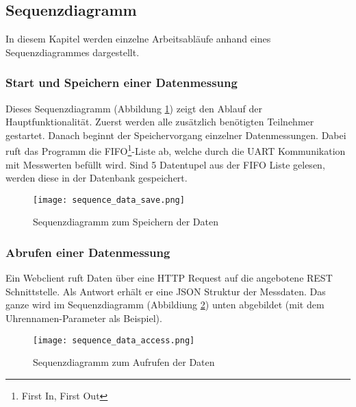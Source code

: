 \subsection{Sequenzdiagramm}
In diesem Kapitel werden einzelne Arbeitsabläufe anhand eines Sequenzdiagrammes dargestellt.
	\subsubsection{Start und Speichern einer Datenmessung}
    Dieses Sequenzdiagramm (Abbildung \ref{fig:sequence_save}) zeigt den Ablauf der Hauptfunktionalität.
    Zuerst werden alle zusätzlich benötigten Teilnehmer gestartet.
    Danach beginnt der Speichervorgang einzelner Datenmessungen.
    Dabei ruft das Programm die FIFO\footnote{First In, First Out}-Liste ab, welche durch die UART Kommunikation mit Messwerten befüllt wird.
    Sind 5 Datentupel aus der FIFO Liste gelesen, werden diese in der Datenbank gespeichert.
    \begin{figure}[H]
        \centering
        \texttt{[image: sequence\_data\_save.png]}
        \caption{Sequenzdiagramm zum Speichern der Daten}
        \label{fig:sequence_save}
    \end{figure}

    \clearpage
    \subsubsection{Abrufen einer Datenmessung}
    Ein Webclient ruft Daten über eine HTTP Request auf die angebotene REST Schnittstelle.
    Als Antwort erhält er eine JSON Struktur der Messdaten.
    Das ganze wird im Sequenzdiagramm (Abbildiung \ref{fig:sequence_get}) unten abgebildet (mit dem Uhrennamen-Parameter als Beispiel).
    \begin{figure}[H]
        \centering
        \texttt{[image: sequence\_data\_access.png]}
        \caption{Sequenzdiagramm zum Aufrufen der Daten}
        \label{fig:sequence_get}
    \end{figure}